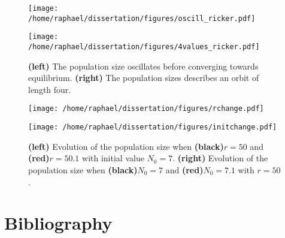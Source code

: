\documentclass{article}
\begin{document}
	\begin{figure}[htb]
		\centering
		\begin{minipage}{0.4\textwidth}
			\centering
			\texttt{[image: /home/raphael/dissertation/figures/oscill\_ricker.pdf]}
		\end{minipage}
		\begin{minipage}{0.4\textwidth}
			\centering
			\texttt{[image: /home/raphael/dissertation/figures/4values\_ricker.pdf]}
		\end{minipage}
		\caption{\textbf{(left)} The population size oscillates before converging towards equilibrium. \textbf{(right)} The population sizes describes an orbit of length four.}
		\label{fig:oscill}
	\end{figure}
	
	\begin{figure}[htb]
		\centering
		\begin{minipage}{0.4\textwidth}
			\centering
			\texttt{[image: /home/raphael/dissertation/figures/rchange.pdf]}
		\end{minipage}
		\begin{minipage}{0.4\textwidth}
			\centering
			\texttt{[image: /home/raphael/dissertation/figures/initchange.pdf]}
		\end{minipage}
		\caption{\textbf{(left)} Evolution of the population size when \textbf{(black)}$r=50$ and \textbf{(red)}$r=50.1$ with initial value $N_0=7$. \textbf{(right)} Evolution of the population size when \textbf{(black)}$N_0=7$ and \textbf{(red)}$N_0=7.1$ with $r=50$.}
		\label{fig:chaos}
	\end{figure}

\clearpage
	\section{Bibliography}
	
	{}
\end{document}
